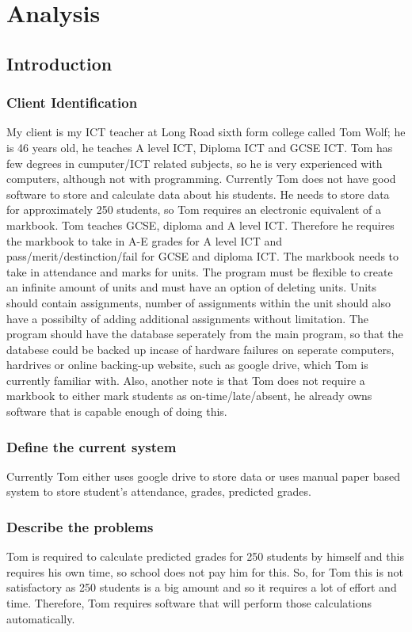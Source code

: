 \chapter{Analysis}

\section{Introduction}

\subsection{Client Identification} 
My client is my ICT teacher at Long Road
sixth form college called Tom Wolf; he is 46 years old, he teaches A level ICT, Diploma ICT and GCSE ICT. Tom has few degrees in cumputer/ICT related subjects, so he is very experienced with computers, although not with programming. Currently Tom does not have good software to store and calculate data about his students. He needs to store data for approximately 250 students, so Tom requires an electronic equivalent of a markbook. Tom teaches GCSE, diploma and A level ICT. Therefore he requires the markbook to take in A-E grades for A level ICT and pass/merit/destinction/fail for GCSE and diploma ICT. The markbook needs to take in attendance and marks for units. The program must be flexible to create an infinite amount of units and must have an option of deleting units. Units should contain assignments, number of assignments within the unit should also have a possibilty of adding additional assignments without limitation. The program should have the database seperately from the main program, 
so that the databese could be backed up incase of hardware failures on seperate computers, hardrives or online backing-up website, such as google drive, which Tom is currently familiar with.
Also, another note is that Tom does not require a markbook to either mark students as on-time/late/absent, he already owns software that is capable enough of doing this.

\subsection{Define the current system} 
Currently Tom either uses google drive to store data or uses manual paper based system to store student's attendance, grades, predicted grades. 

\subsection{Describe the problems}
Tom is required to calculate predicted grades for 250 students by himself and this requires his own time, so school does not pay him for this. So, for Tom this is not satisfactory as 250 students is a big amount and so it requires a lot of effort and time. Therefore, Tom requires software that will perform those calculations automatically. 
